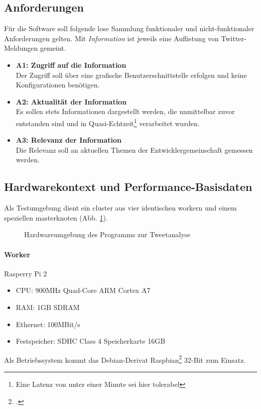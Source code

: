 \subsection{Anforderungen}

Für die Software soll folgende lose Sammlung funktionaler und nicht-funktionaler Anforderungen gelten. Mit \textit{Information} ist jeweils eine Auflistung von Twitter-Meldungen gemeint.

\begin{itemize}
	\item \textbf{A1: Zugriff auf die Information}\\
	Der Zugriff soll über eine grafische Benutzerschnittstelle erfolgen und keine Konfigurationen benötigen.
	\item \textbf{A2: Aktualität der Information}\\
	Es sollen stets Informationen dargestellt werden, die unmittelbar zuvor entstanden sind und in Quasi-Echtzeit\footnote{Eine Latenz von unter einer Minute sei hier tolerabel} verarbeitet wurden.
	\item \textbf{A3: Relevanz der Information}\\
	Die Relevanz soll an aktuellen Themen der Entwicklergemeinschaft gemessen werden.
\end{itemize}

\subsection{Hardwarekontext und Performance-Basisdaten}

Als Testumgebung dient ein \gls{cluster} aus vier identischen \gls{worker}n und einem speziellen \gls{master}knoten (Abb. \ref{figure:versuchsaufbau}).

\begin{figure}[h]
	\centering
  
	\caption{Hardwareumgebung des Programms zur Tweetanalyse}
	\label{figure:versuchsaufbau}
\end{figure}

\paragraph{Worker}
Rasperry Pi 2
\begin{itemize}
	\item CPU: 900MHz Quad-Core ARM Cortex A7
	\item RAM: 1GB SDRAM
	\item Ethernet: 100MBit/s
	\item Festspeicher: SDHC Class 4 Speicherkarte 16GB
\end{itemize}
Als Betriebssystem kommt das Debian-Derivat Raspbian\footcite{raspbian} 32-Bit zum Einsatz.


